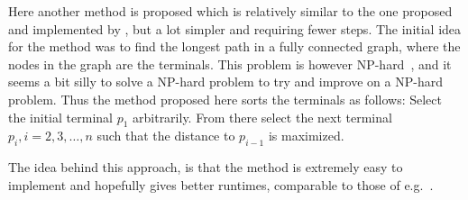 Here another method is proposed which is relatively similar to the one proposed
and implemented by \textcite{fonseca2014}, but a lot simpler and requiring fewer
steps. The initial idea for the method was to find the longest path in a fully
connected graph, where the nodes in the graph are the terminals. This problem is
however NP-hard~\cite{longestpathproblem}, and it seems a bit silly to solve a
NP-hard problem to try and improve on a NP-hard problem. Thus the method
proposed here sorts the terminals as follows: Select the initial terminal $p_1$
arbitrarily. From there select the next terminal $p_i, i = 2, 3, \ldots, n$ such
that the distance to $p_{i-1}$ is maximized.

The idea behind this approach, is that the method is extremely easy to implement
and hopefully gives better runtimes, comparable to those of e.g.\
\textcite{fonseca2014}.

